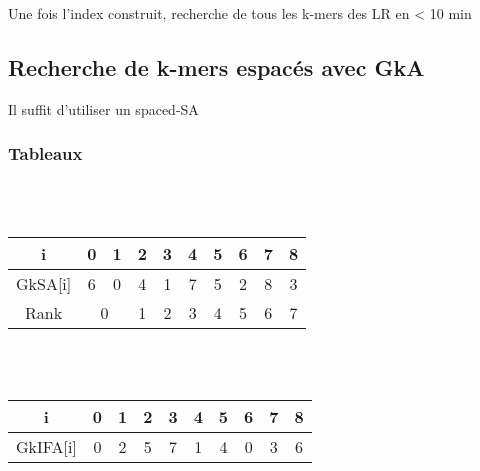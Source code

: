 \documentclass[12pt]{article}
\begin{document}
Une fois l'index construit, recherche de tous les k-mers des LR en < 10 min \\

\subsection{Recherche de k-mers espacés avec GkA}

Il suffit d'utiliser un spaced-SA 

\subsubsection{Tableaux}

 \\ \\

\begin{tabular}{|c|c|c|c|c|c|c|c|c|c|}
	\hline
	i & 0 & 1 & 2 & 3 & 4 & 5 & 6 & 7 & 8 \\
	\hline
	GkSA[i] & 6 & 0 & 4 & 1 & 7 & 5 & 2 & 8 & 3 \\
	\hline
	Rank & \multicolumn{2}{|c|}{0} & 1 & 2 & 3 & 4 & 5 & 6 & 7 \\
	\hline
\end{tabular} \\\\

\begin{tabular}{|c|c|c|c|c|c|c|c|c|c|}
	\hline
	i & 0 & 1 & 2 & 3 & 4 & 5 & 6 & 7 & 8 \\
	\hline
	GkIFA[i] & 0 & 2 & 5 & 7 & 1 & 4 & 0 & 3 & 6 \\
	\hline
\end{tabular} \\\\
\end{document}
